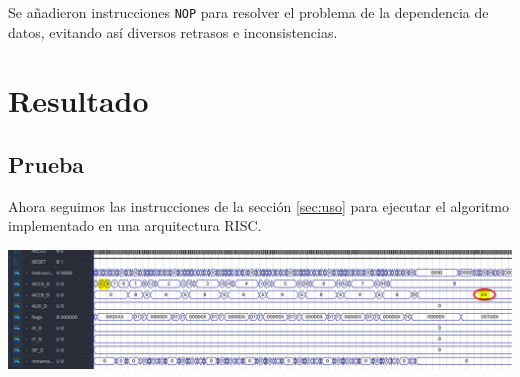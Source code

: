 \documentclass{IEEEtran}
\begin{document}
Se añadieron instrucciones \texttt{NOP} para resolver el problema de la dependencia de datos, evitando así diversos retrasos e inconsistencias.

\section{Resultado}
\label{sec:org3b4b5c3}
\subsection{Prueba}
\label{sec:orgc62edc6}
Ahora seguimos las instrucciones de la sección \ref{sec:uso} para ejecutar el algoritmo implementado en una arquitectura RISC.
\begin{center}
\includegraphics[width=.9\linewidth]{../img/7.png}
\end{center}
\end{document}
